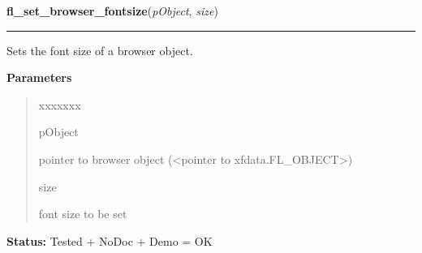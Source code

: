 \hspace{.8\funcindent}\begin{boxedminipage}{\funcwidth}

    \raggedright \textbf{fl\_set\_browser\_fontsize}(\textit{pObject}, \textit{size})

    \vspace{-1.5ex}

    \rule{\textwidth}{0.5\fboxrule}
\setlength{\parskip}{2ex}
    Sets the font size of a browser object.

\setlength{\parskip}{1ex}
      \textbf{Parameters}
      \vspace{-1ex}

      \begin{quote}
        \begin{Ventry}{xxxxxxx}

          \item[pObject]

          pointer to browser object ({\textless}pointer to 
          xfdata.FL\_OBJECT{\textgreater})

          \item[size]

          font size to be set

        \end{Ventry}

      \end{quote}

\textbf{Status:} Tested + NoDoc + Demo = OK



    \end{boxedminipage}

    \label{xformslib:library:fl_set_browser_fontstyle}

    \vspace{0.5ex}


